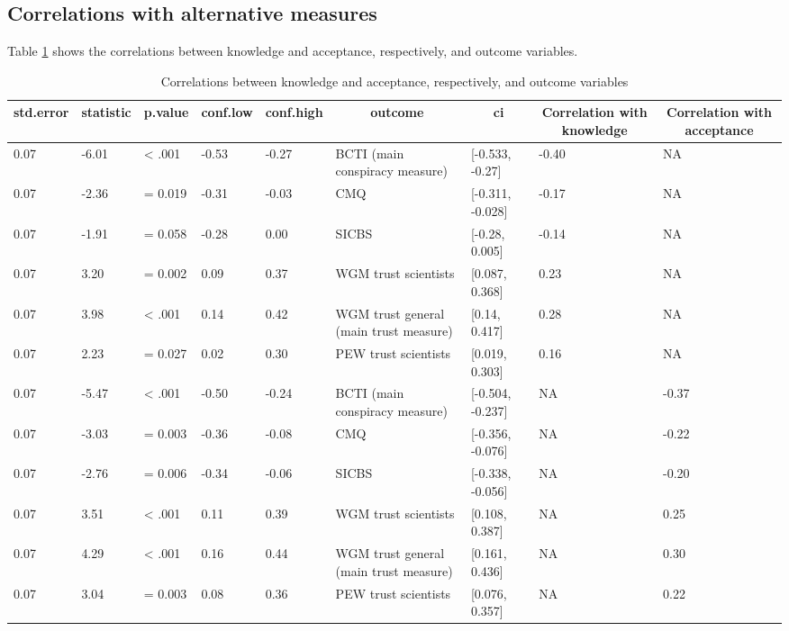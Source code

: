 \documentclass[
  doc,floatsintext]{apa6}
\begin{document}
\subsection{Correlations with alternative measures}\label{correlations-with-alternative-measures-1}

Table \ref{tab:exp2-correlations-outcomes} shows the correlations between knowledge and acceptance, respectively, and outcome variables.

\begin{table}[tbp]

\begin{center}
\begin{threeparttable}

\caption{\label{tab:exp2-correlations-outcomes}Correlations between knowledge and acceptance, respectively, and outcome variables}

\begin{tabular}{lllllllll}
\toprule
std.error & \multicolumn{1}{c}{statistic} & \multicolumn{1}{c}{p.value} & \multicolumn{1}{c}{conf.low} & \multicolumn{1}{c}{conf.high} & \multicolumn{1}{c}{outcome} & \multicolumn{1}{c}{ci} & \multicolumn{1}{c}{Correlation with knowledge} & \multicolumn{1}{c}{Correlation with acceptance}\\
\midrule
0.07 & -6.01 & < .001 & -0.53 & -0.27 & BCTI 
(main conspiracy measure) & {}[-0.533, -0.27] & -0.40 & NA\\
0.07 & -2.36 & = 0.019 & -0.31 & -0.03 & CMQ & {}[-0.311, -0.028] & -0.17 & NA\\
0.07 & -1.91 & = 0.058 & -0.28 & 0.00 & SICBS & {}[-0.28, 0.005] & -0.14 & NA\\
0.07 & 3.20 & = 0.002 & 0.09 & 0.37 & WGM trust scientists & {}[0.087, 0.368] & 0.23 & NA\\
0.07 & 3.98 & < .001 & 0.14 & 0.42 & WGM trust general 
(main trust measure) & {}[0.14, 0.417] & 0.28 & NA\\
0.07 & 2.23 & = 0.027 & 0.02 & 0.30 & PEW trust scientists & {}[0.019, 0.303] & 0.16 & NA\\
0.07 & -5.47 & < .001 & -0.50 & -0.24 & BCTI 
(main conspiracy measure) & {}[-0.504, -0.237] & NA & -0.37\\
0.07 & -3.03 & = 0.003 & -0.36 & -0.08 & CMQ & {}[-0.356, -0.076] & NA & -0.22\\
0.07 & -2.76 & = 0.006 & -0.34 & -0.06 & SICBS & {}[-0.338, -0.056] & NA & -0.20\\
0.07 & 3.51 & < .001 & 0.11 & 0.39 & WGM trust scientists & {}[0.108, 0.387] & NA & 0.25\\
0.07 & 4.29 & < .001 & 0.16 & 0.44 & WGM trust general 
(main trust measure) & {}[0.161, 0.436] & NA & 0.30\\
0.07 & 3.04 & = 0.003 & 0.08 & 0.36 & PEW trust scientists & {}[0.076, 0.357] & NA & 0.22\\
\bottomrule
\end{tabular}

\end{threeparttable}
\end{center}

\end{table}
\end{document}
